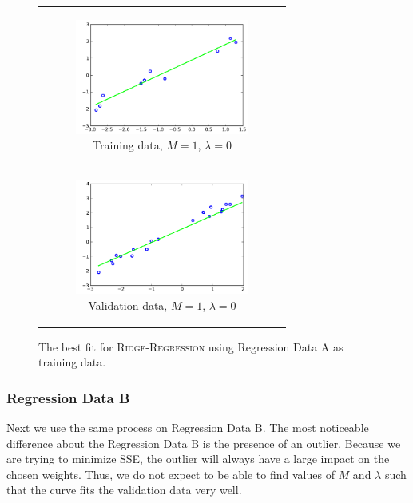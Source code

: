 \documentclass{sigchi}
\begin{document}
\begin{figure}[!t]
\centering
\begin{tabular}{c}

\begin{subfigure}[b]{2.25in}
	\includegraphics[width = 2.25in]{A-1-0.png}
	\caption{Training data, $M = 1$, $\lambda = 0$}
\end{subfigure} \\

\begin{subfigure}[b]{2.25in}
	\includegraphics[width = 2.25in]{AV-1-0.png}
	\caption{Validation data, $M = 1$, $\lambda = 0$}
\end{subfigure} \\

\end{tabular}

\caption{The best fit for \textsc{Ridge-Regression} using Regression Data A as training data.}
\end{figure}

\subsubsection{Regression Data B}

Next we use the same process on Regression Data B. The most noticeable difference about the Regression Data B is the presence of an outlier. Because we are trying to minimize SSE, the outlier will always have a large impact on the chosen weights. Thus, we do not expect to be able to find values of $M$ and $\lambda$ such that the curve fits the validation data very well.
\end{document}
